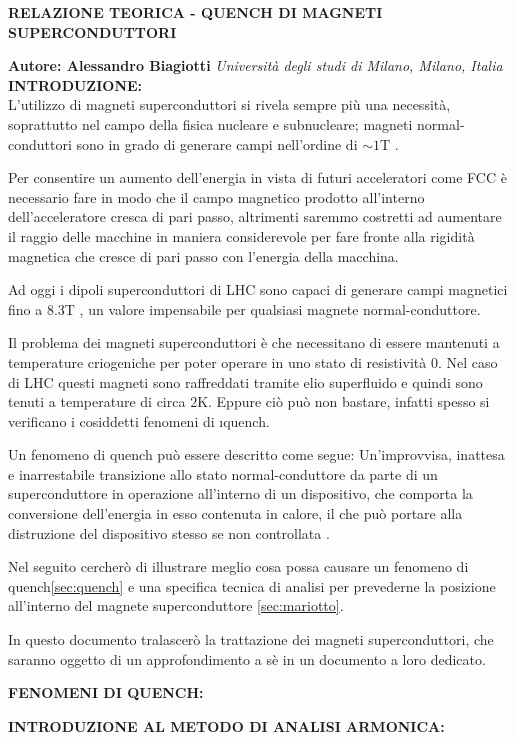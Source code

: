 \documentclass[a4paper,10pt]{article}
\begin{document}
\noindent
\begin{center}
	\textbf{{\Large RELAZIONE TEORICA - QUENCH DI MAGNETI SUPERCONDUTTORI}} \\
\end{center}

\noindent
\textbf{Autore: Alessandro Biagiotti} \hfill \textit{Università degli studi di Milano, Milano,
	Italia}
\\

\noindent
{}
\makeatletter\def\@currentlabel{\texttt{(I)}}\makeatother
\label{sec:intro}
\textbf{INTRODUZIONE:}
\\
L'utilizzo di magneti superconduttori si rivela sempre più una necessità, soprattutto nel campo
della fisica nucleare e subnucleare; magneti normal-conduttori sono in grado di generare campi
nell'ordine di $\sim 1$T \cite{magnets}.

Per consentire un aumento dell'energia in vista di futuri acceleratori come FCC è necessario fare
in
modo che il campo magnetico prodotto all'interno dell'acceleratore cresca di pari passo, altrimenti
saremmo costretti ad aumentare il raggio delle macchine in maniera considerevole per fare fronte
alla rigidità magnetica che cresce di pari passo con l'energia della macchina.

Ad oggi i dipoli superconduttori di LHC sono capaci di generare campi magnetici fino a $8.3$T
\cite{lhc-field}, un valore impensabile per qualsiasi magnete normal-conduttore.

Il problema dei magneti superconduttori è che necessitano di essere mantenuti a temperature
criogeniche per poter operare in uno stato di resistività $0$. Nel caso di LHC questi magneti sono
raffreddati tramite elio superfluido e quindi sono tenuti a temperature di circa $2$K. Eppure ciò
può non bastare, infatti spesso si verificano i cosiddetti fenomeni di \i{quench}.

Un fenomeno di quench può essere descritto come segue: Un'improvvisa, inattesa e inarrestabile
transizione allo stato normal-conduttore da parte di un superconduttore in operazione all'interno
di
un dispositivo, che comporta la conversione dell'energia in esso contenuta in calore, il che può
portare alla distruzione del dispositivo stesso se non controllata \cite{quench-pres}.

Nel seguito cercherò di illustrare meglio cosa possa causare un fenomeno di quench\ref{sec:quench} e una specifica tecnica di analisi per prevederne la posizione all'interno del magnete superconduttore \ref{sec:mariotto}.

In questo documento tralascerò la trattazione dei magneti superconduttori, che saranno oggetto di
un
approfondimento a sè in un documento a loro dedicato.

\bigskip
{}
\makeatletter\def\@currentlabel{\texttt{(II)}}\makeatother
\label{sec:quench}
\noindent
\textbf{FENOMENI DI QUENCH:}

\bigskip
{}
\makeatletter\def\@currentlabel{\texttt{(III)}}\makeatother
\label{sec:mariotto}
\noindent
\textbf{INTRODUZIONE AL METODO DI ANALISI ARMONICA:}

\clearpage

\printbibliography
\end{document}
